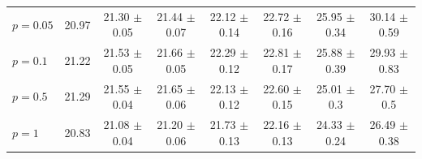 \begin{table}
\begin{tabular}{|l | c | c | c | c | c | c | c |}
		\Random[$0.05$] $p{=}0.05$ & 20.97 & 21.30 {\color{gray}\scriptsize ${\pm}$0.05} & 21.44 {\color{gray}\scriptsize ${\pm}$0.07} & 22.12 {\color{gray}\scriptsize ${\pm}$0.14} & 22.72 {\color{gray}\scriptsize ${\pm}$0.16} & 25.95 {\color{gray}\scriptsize ${\pm}$0.34} & 30.14 {\color{gray}\scriptsize ${\pm}$0.59}\\
		\Random[$0.05$] $p{=}0.1$ & 21.22 & 21.53 {\color{gray}\scriptsize ${\pm}$0.05} & 21.66 {\color{gray}\scriptsize ${\pm}$0.05} & 22.29 {\color{gray}\scriptsize ${\pm}$0.12} & 22.81 {\color{gray}\scriptsize ${\pm}$0.17} & 25.88 {\color{gray}\scriptsize ${\pm}$0.39} & 29.93 {\color{gray}\scriptsize ${\pm}$0.83}\\
		\Random[$0.05$] $p{=}0.5$ & 21.29 & 21.55 {\color{gray}\scriptsize ${\pm}$0.04} & 21.65 {\color{gray}\scriptsize ${\pm}$0.06} & 22.13 {\color{gray}\scriptsize ${\pm}$0.12} & 22.60 {\color{gray}\scriptsize ${\pm}$0.15} & 25.01 {\color{gray}\scriptsize ${\pm}$0.3} & 27.70 {\color{gray}\scriptsize ${\pm}$0.5}\\
		\Random[$0.05$] $p{=}1$ & 20.83 & 21.08 {\color{gray}\scriptsize ${\pm}$0.04} & 21.20 {\color{gray}\scriptsize ${\pm}$0.06} & 21.73 {\color{gray}\scriptsize ${\pm}$0.13} & 22.16 {\color{gray}\scriptsize ${\pm}$0.13} & 24.33 {\color{gray}\scriptsize ${\pm}$0.24} & 26.49 {\color{gray}\scriptsize ${\pm}$0.38}\\
		\hline
	\end{tabular}
\end{table}
